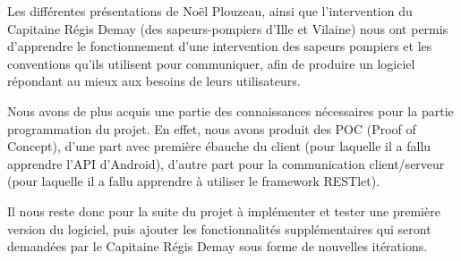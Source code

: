 \documentclass{article}
\begin{document}
Les différentes présentations de Noël Plouzeau, ainsi que l’intervention du Capitaine Régis Demay (des sapeurs-pompiers d’Ille et Vilaine) nous ont permis d’apprendre le fonctionnement d’une intervention des sapeurs pompiers et les conventions qu’ils utilisent pour communiquer, afin de produire un logiciel répondant au mieux aux besoins de leurs utilisateurs.

Nous avons de plus acquis une partie des connaissances nécessaires pour la partie programmation du projet. En effet, nous avons produit des POC (Proof of Concept), d’une part  avec première ébauche du client (pour laquelle il a fallu apprendre l’API d’Android), d’autre part pour la communication client/serveur (pour laquelle il a fallu apprendre à utiliser le framework RESTlet).

Il nous reste donc pour la suite du projet à implémenter et tester une première version du logiciel, puis ajouter les fonctionnalités supplémentaires qui seront demandées par le Capitaine Régis Demay sous forme de nouvelles itérations.
\end{document}
